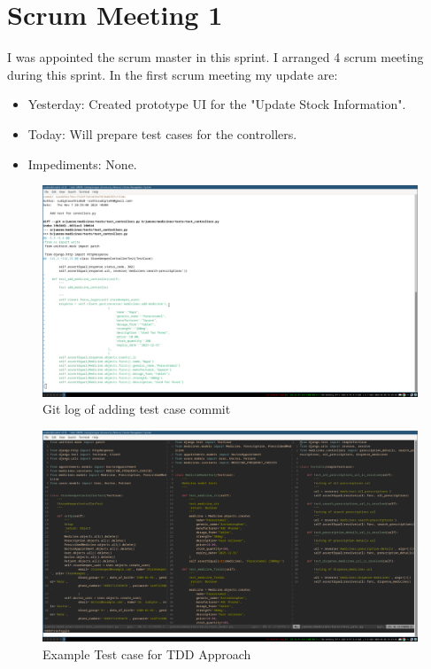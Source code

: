 \documentclass[a4paper,12pt]{article}
\begin{document}
\section{Scrum Meeting 1}
I was appointed the scrum master in this sprint. I arranged 4 scrum meeting during this sprint. In the first
scrum meeting my update are:
\begin{itemize}
    \item Yesterday: Created prototype UI for the "Update Stock Information".
    \item Today: Will prepare test cases for the controllers.
    \item Impediments: None.
\end{itemize}
\begin{figure}[H]
    \centering
    \includegraphics[width=1\textwidth]{images/meet11.png}   
    \caption{Git log of adding test case commit}
    \label{fig:meet11}
\end{figure}
\begin{figure}[H]
    \centering
    \includegraphics[width=1\textwidth]{images/meet12.png}   
    \caption{Example Test case for TDD Approach}
    \label{fig:meet12}
\end{figure}
\end{document}
